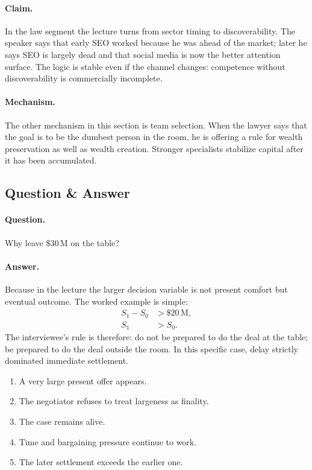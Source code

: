 \paragraph{Claim.} In the law segment the lecture turns from sector timing to discoverability. The speaker says that early SEO worked because he was ahead of the market; later he says SEO is largely dead and that social media is now the better attention surface. The logic is stable even if the channel changes: competence without discoverability is commercially incomplete.

\paragraph{Mechanism.} The other mechanism in this section is team selection. When the lawyer says that the goal is to be the dumbest person in the room, he is offering a rule for wealth preservation as well as wealth creation. Stronger specialists stabilize capital after it has been accumulated.

\subsection{Question \& Answer}

\paragraph{Question.} Why leave \(\$30\,\mathrm{M}\) on the table?

\paragraph{Answer.} Because in the lecture the larger decision variable is not present comfort but eventual outcome. The worked example is simple:
\begin{align}
S_1-S_0 &> \$20\,\mathrm{M},\\
S_1 &> S_0.
\end{align}
The interviewee's rule is therefore: do not be prepared to do the deal at the table; be prepared to do the deal outside the room. In this specific case, delay strictly dominated immediate settlement.

\begin{enumerate}
\item A very large present offer appears.
\item The negotiator refuses to treat largeness as finality.
\item The case remains alive.
\item Time and bargaining pressure continue to work.
\item The later settlement exceeds the earlier one.
\end{enumerate}

